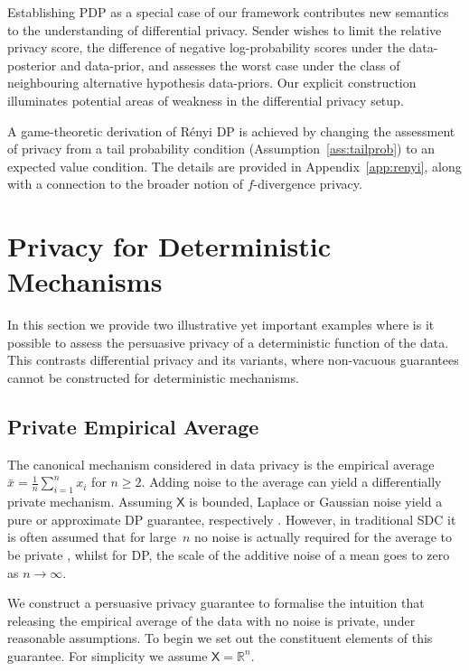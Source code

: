 \documentclass{article}
\theoremstyle{plain}
\theoremstyle{plain}
\theoremstyle{definition}
\theoremstyle{remark}
\theoremstyle{plain}
\newcommand{\xset}{\mathsf{X}}
\begin{document}
Establishing PDP as a special case of our framework contributes new semantics to the understanding of differential privacy. Sender wishes to limit the relative privacy score, the difference of negative log-probability scores under the data-posterior and data-prior, and assesses the worst case under the class of neighbouring alternative hypothesis data-priors. Our explicit construction illuminates potential areas of weakness in the differential privacy setup.

A game-theoretic derivation of R\'{e}nyi DP \citep{mironov2017renyi} is achieved by changing the assessment of privacy from a tail probability condition (Assumption~\ref{ass:tailprob}) to an expected value condition. The details are provided in Appendix~\ref{app:renyi}, along with a connection to the broader notion of $f$-divergence privacy.

\section{Privacy for Deterministic Mechanisms}\label{sec:Deterministic}
In this section we provide two illustrative yet important examples where is it possible to assess the persuasive privacy of a deterministic function of the data. This contrasts differential privacy and its variants, where non-vacuous guarantees cannot be constructed for deterministic mechanisms.

\subsection{Private Empirical Average} \label{sec:average}

The canonical mechanism considered in data privacy is the empirical average $\bar{x}=\frac{1}{n}\sum_{i=1}^n x_i$ for $n\geq 2$. Adding noise to the average can yield a differentially private mechanism. Assuming $\xset$ is bounded, Laplace or Gaussian noise yield a pure or approximate DP guarantee, respectively \citep{dwork2006approxdp}. However, in traditional SDC it is often assumed that for large~$n$ no noise is actually required for the average to be private \citep[assuming that differencing attacks and group disclosures are not possible, see e.g.,][]{smithMeasureDisclosureRisk2008}, whilst for DP, the scale of the additive noise of a mean goes to zero as $n \rightarrow \infty$.


We construct a persuasive privacy guarantee to formalise the intuition that releasing the empirical average of the data with no noise is private, under reasonable assumptions. To begin we set out the constituent elements of this guarantee. For simplicity we assume $\xset=\mathbb{R}^n$.
\end{document}
